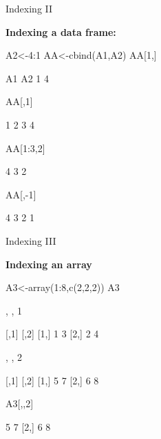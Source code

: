 \documentclass[11pt,german,hideothersubsections]{beamer}
\begin{document}
\begin{frame}[fragile]{Indexing II}
\begin{center}
\textbf{Indexing a data frame:}
\end{center}
\begin{Schunk}
\begin{Sinput}
 A2<-4:1
 AA<-cbind(A1,A2)
 AA[1,]
\end{Sinput}
\begin{Soutput}
A1 A2 
 1  4 
\end{Soutput}
\begin{Sinput}
 AA[,1]
\end{Sinput}
\begin{Soutput}
[1] 1 2 3 4
\end{Soutput}
\begin{Sinput}
 AA[1:3,2]
\end{Sinput}
\begin{Soutput}
[1] 4 3 2
\end{Soutput}
\begin{Sinput}
 AA[,-1]
\end{Sinput}
\begin{Soutput}
[1] 4 3 2 1
\end{Soutput}
\end{Schunk}
\end{frame}
\begin{frame}[fragile]{Indexing III}
\begin{center}
\textbf{Indexing an array}
\end{center}
\begin{scriptsize}
\begin{Schunk}
\begin{Sinput}
 A3<-array(1:8,c(2,2,2))
 A3
\end{Sinput}
\begin{Soutput}
, , 1

     [,1] [,2]
[1,]    1    3
[2,]    2    4

, , 2

     [,1] [,2]
[1,]    5    7
[2,]    6    8
\end{Soutput}
\begin{Sinput}
 A3[,,2]
\end{Sinput}
\begin{Soutput}
     [,1] [,2]
[1,]    5    7
[2,]    6    8
\end{Soutput}
\end{Schunk}
\end{scriptsize}
\end{frame}
\end{document}
